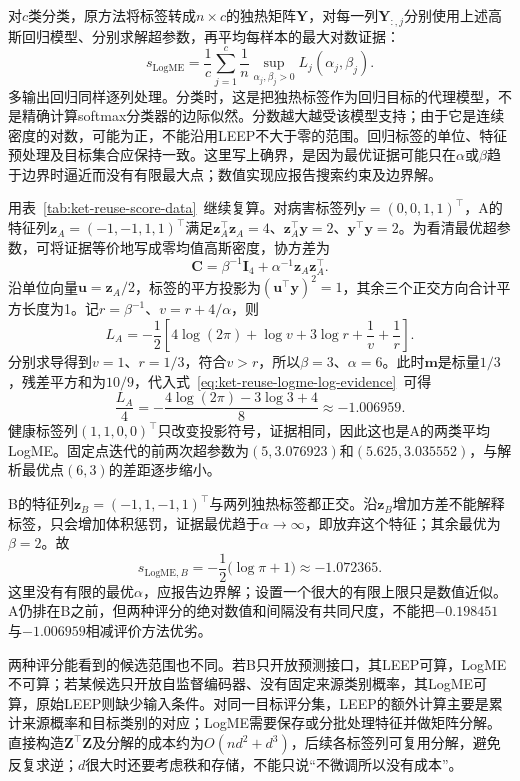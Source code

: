 对$c$类分类，原方法将标签转成$n\times c$的独热矩阵$\bm Y$，对每一列$\bm Y_{:,j}$分别使用上述高斯回归模型、分别求解超参数，再平均每样本的最大对数证据：
\begin{equation}
  s_{\mathrm{LogME}}
  =\frac1c\sum_{j=1}^{c}\frac1n
    \sup_{\alpha_j,\beta_j>0}
    L_j(\alpha_j,\beta_j).
  \label{eq:ket-reuse-logme-score}
\end{equation}
多输出回归同样逐列处理。分类时，这是把独热标签作为回归目标的代理模型，不是精确计算softmax分类器的边际似然。分数越大越受该模型支持；由于它是连续密度的对数，可能为正，不能沿用LEEP不大于零的范围。回归标签的单位、特征预处理及目标集合应保持一致。这里写上确界，是因为最优证据可能只在$\alpha$或$\beta$趋于边界时逼近而没有有限最大点；数值实现应报告搜索约束及边界解。

用表~\ref{tab:ket-reuse-score-data}~继续复算。对病害标签列$\bm y=(0,0,1,1)^\top$，A的特征列$\bm z_A=(-1,-1,1,1)^\top$满足$\bm z_A^\top\bm z_A=4$、$\bm z_A^\top\bm y=2$、$\bm y^\top\bm y=2$。为看清最优超参数，可将证据等价地写成零均值高斯密度，协方差为
\[
  \bm C=\beta^{-1}\bm I_4+\alpha^{-1}\bm z_A\bm z_A^\top.
\]
沿单位向量$\bm u=\bm z_A/2$，标签的平方投影为$(\bm u^\top\bm y)^2=1$，其余三个正交方向合计平方长度为1。记$r=\beta^{-1}$、$v=r+4/\alpha$，则
\[
  L_A=-\frac12\left[
  4\log(2\pi)+\log v+3\log r+\frac1v+\frac1r\right].
\]
分别求导得到$v=1$、$r=1/3$，符合$v>r$，所以$\beta=3$、$\alpha=6$。此时$\bm m$是标量$1/3$，残差平方和为$10/9$，代入式~\eqref{eq:ket-reuse-logme-log-evidence}~可得
\[
  \frac{L_A}{4}
  =-\frac{4\log(2\pi)-3\log3+4}{8}
  \approx-1.006959.
\]
健康标签列$(1,1,0,0)^\top$只改变投影符号，证据相同，因此这也是A的两类平均LogME。固定点迭代的前两次超参数为$(5,3.076923)$和$(5.625,3.035552)$，与解析最优点$(6,3)$的差距逐步缩小。

B的特征列$\bm z_B=(-1,1,-1,1)^\top$与两列独热标签都正交。沿$\bm z_B$增加方差不能解释标签，只会增加体积惩罚，证据最优趋于$\alpha\to\infty$，即放弃这个特征；其余最优为$\beta=2$。故
\[
  s_{\mathrm{LogME},B}
  =-\frac12\bigl(\log\pi+1\bigr)
  \approx-1.072365.
\]
这里没有有限的最优$\alpha$，应报告边界解；设置一个很大的有限上限只是数值近似。A仍排在B之前，但两种评分的绝对数值和间隔没有共同尺度，不能把$-0.198451$与$-1.006959$相减评价方法优劣。

两种评分能看到的候选范围也不同。若B只开放预测接口，其LEEP可算，LogME不可算；若某候选只开放自监督编码器、没有固定来源类别概率，其LogME可算，原始LEEP则缺少输入条件。对同一目标评分集，LEEP的额外计算主要是累计来源概率和目标类别的对应；LogME需要保存或分批处理特征并做矩阵分解。直接构造$\bm Z^\top\bm Z$及分解的成本约为$O(nd^2+d^3)$，后续各标签列可复用分解，避免反复求逆；$d$很大时还要考虑秩和存储，不能只说“不微调所以没有成本”。

